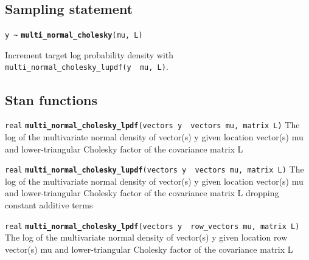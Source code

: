 \documentclass[
  10pt,
]{book}
\begin{document}
\hypertarget{sampling-statement-51}{%
\subsection{Sampling statement}\label{sampling-statement-51}}

\texttt{y\ \textasciitilde{}} \textbf{\texttt{multi\_normal\_cholesky}}\texttt{(mu,\ L)}

Increment target log probability density with \texttt{multi\_normal\_cholesky\_lupdf(y\ \textbar{}\ mu,\ L)}.

\hypertarget{stan-functions-50}{%
\subsection{Stan functions}\label{stan-functions-50}}


\texttt{real} \textbf{\texttt{multi\_normal\_cholesky\_lpdf}}\texttt{(vectors\ y\ \textbar{}\ vectors\ mu,\ matrix\ L)}\newline
The log of the multivariate normal density of vector(s) y given
location vector(s) mu and lower-triangular Cholesky factor of the
covariance matrix L


\texttt{real} \textbf{\texttt{multi\_normal\_cholesky\_lupdf}}\texttt{(vectors\ y\ \textbar{}\ vectors\ mu,\ matrix\ L)}\newline
The log of the multivariate normal density of vector(s) y given
location vector(s) mu and lower-triangular Cholesky factor of the
covariance matrix L dropping constant additive terms


\texttt{real} \textbf{\texttt{multi\_normal\_cholesky\_lpdf}}\texttt{(vectors\ y\ \textbar{}\ row\_vectors\ mu,\ matrix\ L)}\newline
The log of the multivariate normal density of vector(s) y given
location row vector(s) mu and lower-triangular Cholesky factor of the
covariance matrix L

\end{document}
